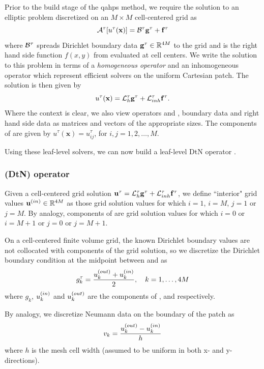 Prior to the build stage of the \gls{qahps} method, we require the solution to an elliptic problem  discretized on an $M \times M$ cell-centered grid as
\begin{equation}
\mathcal{A}^{\tau}[u^{\tau}(\textbf{x})] = \mathcal B^\tau \mathbf g^{\tau} + \mathbf f^{\tau}
\label{eq:patch_poisson_problem}
\end{equation}
where $\mathcal B^\tau$ spreads Dirichlet boundary data $\mathbf g^{\tau} \in \mathbb R^{4M}$ to the grid and \ftau is the right hand side function $f(x,y)$ from  evaluated at cell centers.  We write the solution to this problem in terms of a {\em homogeneous operator} \Lhtau and an inhomogeneous operator \Linhtau which represent efficient solvers on the uniform Cartesian patch. The solution is then given by 
\begin{equation}
u^{\tau}(\textbf{x}) = \mathcal L_h^{\tau} \mathbf g^{\tau} + \mathcal L_{inh}^{\tau} \mathbf f^{\tau}.
\label{eq:patch_leaf_solve}
\end{equation}
Where the context is clear, we also view operators \Lhtau and \Linhtau, boundary data \gtau and right hand side data \ftau as matrices and vectors of the appropriate sizes. The components of \utau are given by $u^{\tau}(\textbf{x}) = u^\tau_{ij}$, for $i,j = 1, 2, \hdots, M$.  

Using these leaf-level solvers, we can now build a leaf-level DtN operator \Ttau.

\subsubsection{\DtN (DtN) operator}
Given a cell-centered grid solution $\mathbf u^{\tau} = \mathcal L_h^{\tau} \mathbf g^{\tau} + \mathcal L_{inh}^{\tau} \mathbf f^{\tau}$, we define ``interior" grid values $\mathbf u^{(in)} \in \mathbb R^{4M}$ as those grid solution values \utau for which $i = 1$, $i = M$, $j = 1$ or $j = M$.  By analogy, components of \uout are grid solution values for which $i=0$ or $i = M+1$ or $j = 0$ or $j = M+1$.     

On a cell-centered finite volume grid, the known Dirichlet boundary values are not collocated with components of the grid solution, so we discretize the Dirichlet boundary condition at the midpoint between \ukin and \ukout as
\begin{equation}
g_k^\tau = \frac{u_k^{(out)} + u_k^{(in)}}{2}, \quad k = 1,\hdots , 4M
\end{equation}
where $g_k$, $u_k^{(in)}$ and $u_k^{(out)}$ are the components of \gtau, \uin and \uout respectively.  

By analogy, we discretize Neumann data on the boundary of the patch as
\begin{equation}
v_k = \frac{u_k^{(out)} - u_k^{(in)}}{h}
\end{equation}
where $h$ is the mesh cell width (assumed to be uniform in both x- and y- directions).

